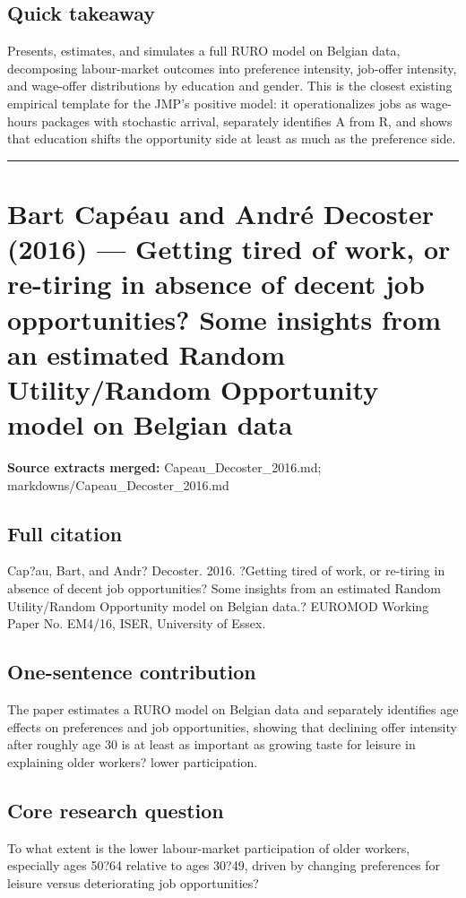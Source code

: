 \documentclass[11pt,a4paper]{article}
\begin{document}
\subsection*{Quick takeaway}
Presents, estimates, and simulates a full RURO model on Belgian data, decomposing labour-market outcomes into preference intensity, job-offer intensity, and wage-offer distributions by education and gender. This is the closest existing empirical template for the JMP's positive model: it operationalizes jobs as wage-hours packages with stochastic arrival, separately identifies A from R, and shows that education shifts the opportunity side at least as much as the preference side.


\medskip\hrule\medskip

\section*{Bart Capéau and André Decoster (2016) — Getting tired of work, or re-tiring in absence of decent job opportunities? Some insights from an estimated Random Utility/Random Opportunity model on Belgian data}

\textbf{Source extracts merged:} Capeau\_Decoster\_2016.md; markdowns/Capeau\_Decoster\_2016.md

\subsection*{Full citation}
Cap?au, Bart, and Andr? Decoster. 2016. ?Getting tired of work, or re-tiring in absence of decent job opportunities? Some insights from an estimated Random Utility/Random Opportunity model on Belgian data.? EUROMOD Working Paper No. EM4/16, ISER, University of Essex.

\subsection*{One-sentence contribution}
The paper estimates a RURO model on Belgian data and separately identifies age effects on preferences and job opportunities, showing that declining offer intensity after roughly age 30 is at least as important as growing taste for leisure in explaining older workers? lower participation.

\subsection*{Core research question}
To what extent is the lower labour-market participation of older workers, especially ages 50?64 relative to ages 30?49, driven by changing preferences for leisure versus deteriorating job opportunities?
\end{document}
